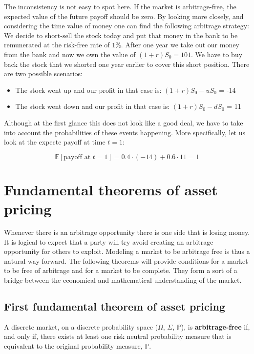 \documentclass[times, utf8, diplomski]{fer}
\begin{document}
The inconsistency is not easy to spot here. If the market is arbitrage-free, the expected value of the future payoff should be zero. By looking more closely, and considering the time value of money one can find the following arbitrage strategy:
We decide to short-sell the stock today and put that money in the bank to be remunerated at the risk-free rate of $1\%$. After one year we take out our money from the bank and now we own the value of $(1+r)S_0 = 101$. We have to buy back the stock that we shorted one year earlier to cover this short position. There are two possible scenarios:
\hfill \break
\begin{itemize}
	\item The stock went up and our profit in that case is: $(1+r)S_0 - uS_0$ = -14
	\item The stock went down and our profit in that case is: $(1+r)S_0 - dS_0$ = 11
\end{itemize}
\hfill \break
Although at the first glance this does not look like a good deal, we have to take into account the probabilities of these events happening. More specifically, let us look at the expecte payoff at time $t=1$:

$$\mathbb{E}[\text{payoff at } t=1] = 0.4 \cdot (-14) + 0.6 \cdot 11 = 1$$

\newpage
\section{Fundamental theorems of asset pricing}
Whenever there is an arbitrage opportunity there is one side that is losing money. It is logical to expect that a party will try avoid creating an arbitrage opportunity for others to exploit. Modeling a market to be arbitrage free is thus a natural way forward. The following theorems will provide conditions for a market to be free of arbitrage and for a market to be complete. They form a sort of a bridge between the economical and mathematical understanding of the market.
\subsection{First fundamental theorem of asset pricing}
\begin{theorem} \label{tm:ftap1}
	A discrete market, on a discrete probability space ($\Omega$, $\Sigma$, $\mathbb{P}$), is \textbf{arbitrage-free} if, and only if, there exists at least one risk neutral probability measure that is equivalent to the original probability measure, $\mathbb{P}$.
\end{theorem}
\end{document}

